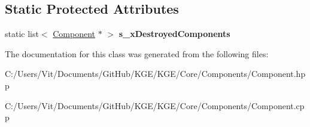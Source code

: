 \subsection*{Static Protected Attributes}
\begin{DoxyCompactItemize}
\item 
\hypertarget{class_k_g_e_1_1_component_ad5e3a3472239064723d799a37f4481e0}{static list$<$ \hyperlink{class_k_g_e_1_1_component}{Component} $\ast$ $>$ {\bfseries s\-\_\-x\-Destroyed\-Components}}\label{class_k_g_e_1_1_component_ad5e3a3472239064723d799a37f4481e0}

\end{DoxyCompactItemize}


The documentation for this class was generated from the following files\-:\begin{DoxyCompactItemize}
\item 
C\-:/\-Users/\-Vit/\-Documents/\-Git\-Hub/\-K\-G\-E/\-K\-G\-E/\-Core/\-Components/Component.\-hpp\item 
C\-:/\-Users/\-Vit/\-Documents/\-Git\-Hub/\-K\-G\-E/\-K\-G\-E/\-Core/\-Components/Component.\-cpp\end{DoxyCompactItemize}

